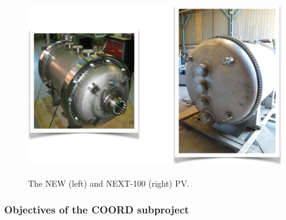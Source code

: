 %
%

\begin{figure}
\centering
\includegraphics[height=8cm]{img/PV.png}
\caption{The NEW (left) and NEXT-100 (right) PV.} \label{fig:PV}
\end{figure}


\subsubsection*{Objectives of the COORD subproject}

